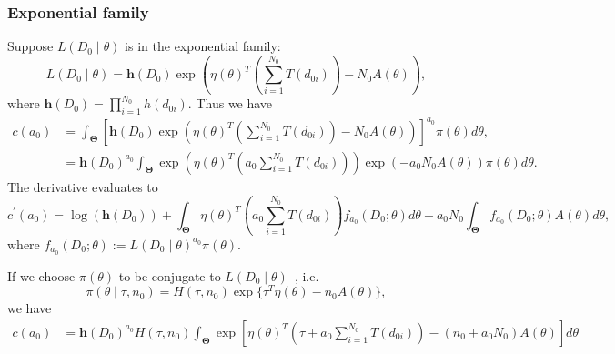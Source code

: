 \documentclass[a4paper, notitlepage, 11pt]{article}
\begin{document}
\subsubsection{Exponential family}
\label{sec:expo_family}

Suppose $L(D_0 \mid \theta)$ is in the exponential family:
\begin{equation}
 L(D_0 \mid \theta) = \boldsymbol h(D_0) \exp \left( \eta(\theta)^T \left(\sum_{i=1}^{N_0} T(d_{0i}) \right) - N_0 A(\theta) \right),
\end{equation}
where $\boldsymbol h(D_0) = \prod_{i = 1}^{N_0} h(d_{0i})$.
Thus we have
\begin{align}
 c(a_0) &=  \int_{\boldsymbol\Theta} \left[ \boldsymbol h(D_0) \exp \left( \eta(\theta)^T \left(\sum_{i=1}^{N_0} T(d_{0i}) \right) - N_0 A(\theta) \right) \right]^{a_0}\pi(\theta) d\theta, \\
  \label{eq:expo_family_const}
 &= \boldsymbol h(D_0)^{a_0}\int_{\boldsymbol\Theta} \exp \left( \eta(\theta)^T \left(a_0 \sum_{i=1}^{N_0} T(d_{0i}) \right) \right) \exp\left(- a_0N_0 A(\theta) \right) \pi(\theta) d\theta.
\end{align}
The derivative evaluates to 
\begin{equation}
\label{eq:expo_family_deriv_general}
 c^\prime(a_0) = \log(\boldsymbol h(D_0)) + \int_{\boldsymbol\Theta} \eta(\theta)^T \left(a_0 \sum_{i=1}^{N_0} T(d_{0i}) \right) f_{a_0}(D_0; \theta) d\theta -  a_0N_0\int_{\boldsymbol\Theta} f_{a_0}(D_0; \theta)  A(\theta) d\theta,
\end{equation}
where $f_{a_0}(D_0; \theta) := L(D_0 \mid \theta)^{a_0}\pi(\theta)$.

If we choose $\pi(\theta)$ to be conjugate to $L(D_0 \mid \theta)$~\citep{Diaconis1979}, i.e.
\begin{equation}
 \label{eq:conj_exp_family}
 \pi(\theta \mid \tau, n_0) = H(\tau, n_0) \exp\{ \tau^T\eta(\theta) - n_0A(\theta) \},
\end{equation}
we have 
\begin{align}
 \label{eq:expo_family_const_conj}
 c(a_0) &= \boldsymbol h(D_0)^{a_0} H(\tau, n_0) \int_{\boldsymbol\Theta}  \exp \left[ \eta(\theta)^T \left( \tau + a_0\sum_{i=1}^{N_0} T(d_{0i}) \right) -(n_0  + a_0N_0) A(\theta) \right] d\theta
\end{align}
\end{document}
